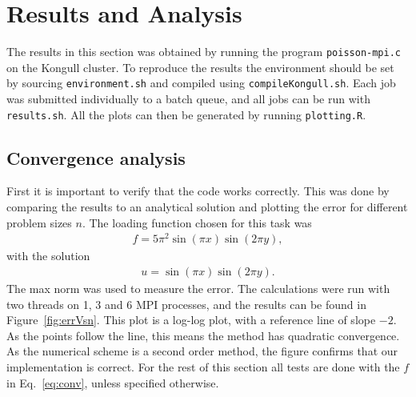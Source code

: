 \section{Results and Analysis}
%
The results in this section was obtained by running the program \verb+poisson-mpi.c+ on the Kongull cluster. To reproduce the results the environment should be set by sourcing \verb+environment.sh+ and compiled using \verb+compileKongull.sh+. Each job was submitted individually to a batch queue, and all jobs can be run with \verb+results.sh+. All the plots can then be generated by running \verb+plotting.R+.
%
\subsection{Convergence analysis}
First it is important to verify that the code works correctly. This was done by comparing the results to an analytical solution and plotting the error for different problem sizes $n$. The loading function chosen for this task was 
\begin{align}
  \label{eq:conv} 
  f = 5 \pi^2 \sin (\pi x) \sin (2 \pi y),
\end{align}
with the solution
\begin{align}
  u = \sin (\pi x) \sin (2 \pi y). 
\end{align}
The max norm was used to measure the error. The calculations were run with two threads on 1, 3 and 6 MPI processes, and the results can be found in Figure~\ref{fig:errVsn}. This plot is a log-log plot, with a reference line of slope $-2$. As the points follow the line, this means the method has quadratic convergence. As the numerical scheme is a second order method, the figure confirms that our implementation is correct. For the rest of this section all tests are done with the $f$ in Eq.~\eqref{eq:conv}, unless specified otherwise.\\
%
